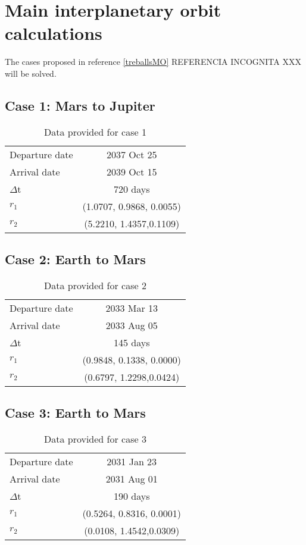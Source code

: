 \section{Main interplanetary orbit calculations}
The cases proposed in reference \ref{treballsMO} REFERENCIA INCOGNITA XXX will be solved. 
\subsection{Case 1: Mars to Jupiter}

\begin{table}[H]
\centering
\begin{tabular}{|lc|}
\hline
Departure date              & 2037 Oct 25                \\ 
Arrival date                & 2039 Oct 15 \\ 
$\Delta$t                    & 720 days                   \\ 
$r_1$                          & (1.0707, 0.9868, 0.0055)  \\ 
$r_2$                          & (5.2210, 1.4357,0.1109)   \\ \hline
\end{tabular}
\caption{Data provided for case 1}
\end{table}

\subsection{Case 2: Earth to Mars}

\begin{table}[H]
\centering
\begin{tabular}{|lc|}
\hline
Departure date              & 2033 Mar 13                \\ 
Arrival date                & 2033 Aug 05 \\ 
$\Delta$t                    & 145 days                   \\ 
$r_1$                          & (0.9848, 0.1338, 0.0000)  \\ 
$r_2$                          & (0.6797, 1.2298,0.0424)   \\ \hline
\end{tabular}
\caption{Data provided for case 2}
\end{table}
\subsection{Case 3: Earth to Mars}
\begin{table}[H]
\centering
\begin{tabular}{|lc|}
\hline
Departure date              & 2031 Jan 23                \\ 
Arrival date                & 2031 Aug 01 \\ 
$\Delta$t                    & 190 days                   \\ 
$r_1$                          & (0.5264, 0.8316, 0.0001)  \\ 
$r_2$                          & (0.0108, 1.4542,0.0309)   \\ \hline
\end{tabular}
\caption{Data provided for case 3}
\end{table}

